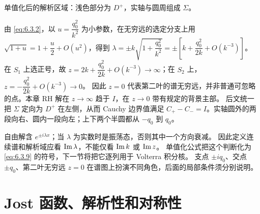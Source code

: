 \documentclass[lang=cn,scheme=chinese,mode=simple,device=normal,color=blue,
math=cm,thmcnt=section,12pt]{elegantbook}
\begin{document}
\begin{center}
    \par\small 单值化后的解析区域：浅色部分为 $D^+$，实轴与圆周组成 $\Sigma$。
\end{center}

\begin{callout}[计算：为什么必须同时处理无穷远和零点]
    由 \eqref{eq:6.3.2}，以 $u=\dfrac{q_0^2}{k^2}$ 为小参数，在无穷远的选定分支上用 $\sqrt{1+u}=1+\dfrac{u}{2}+O(u^2)$，得到 $\lambda=\pm k\sqrt{1+\dfrac{q_0^2}{k^2}}=\pm[k+\dfrac{q_0^2}{2k}+O(k^{-3})]$。
    在 $S_1$ 上选正号，故
    $z=2k+\dfrac{q_0^2}{2k}+O(k^{-3})\to\infty$；在 $S_2$ 上，
    $z=-\dfrac{q_0^2}{2k}+O(k^{-3})\to0$。
    因此 $z=0$ 代表第二叶的谱无穷远，并非普通可忽略的点。本章 RH 解在 $z\to\infty$ 趋于 $I$，在 $z\to0$ 带有规定的背景主部。
    后文统一把 $\Sigma$ 定向为 $D^+$ 在左侧，从而 Cauchy 边界值满足 $C_+-C_-=I$。实轴圆外的两段向右、圆内一段向左；上下两个半圆都从 $-q_0$ 到 $q_0$。
\end{callout}


\begin{callout}
    自由解含 $e^{\pm i\lambda x}$；当 $\lambda$ 为实数时是振荡态，否则其中一个方向衰减。
    因此定义连续谱和解析域应看 $\operatorname{Im}\lambda$，不能仅看 $\operatorname{Im} k$ 或 $\operatorname{Im} z$。
    单值化公式把这个判断化为 \eqref{eq:6.3.9} 的符号，下一节将把它逐列用于 Volterra 积分核。
    支点 $\pm iq_0$、交点 $\pm q_0$、第二叶无穷远 $z=0$ 在谱图上扮演不同角色，后面的局部条件须分别说明。
\end{callout}

\section{Jost 函数、解析性和对称性}
\end{document}
